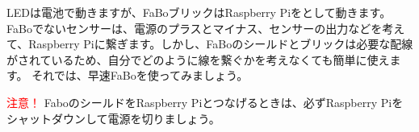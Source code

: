 LEDは電池で動きますが、FaBoブリックはRaspberry Piをとして動きます。FaBoでないセンサーは、電源のプラスとマイナス、センサーの出力などを考えて、Raspberry Piに繋ぎます。しかし、FaBoのシールドとブリックは必要な配線がされているため、自分でどのように線を繋ぐかを考えなくても簡単に使えます。
それでは、早速FaBoを使ってみましょう。

\begin{itembox}[c]{\Large\textcolor{red}{注意！}}
  FaboのシールドをRaspberry Piとつなげるときは、必ずRaspberry Piをシャットダウンして電源を切りましょう。
\end{itembox}

